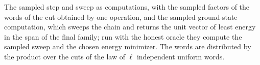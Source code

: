 \begin{definition}
    \label{def:lvv_sampled_programs}
    \leanok
    The sampled step and sweep as computations, with the sampled factors of the
    words of the cut obtained by one operation, and the sampled ground-state
    computation, which sweeps the chain and returns the unit vector of least
    energy in the span of the final family; run with the honest oracle they
    compute the sampled sweep and the chosen energy minimizer. The words are
    distributed by the product over the cuts of the law of $\ell$ independent
    uniform words.
\end{definition}

